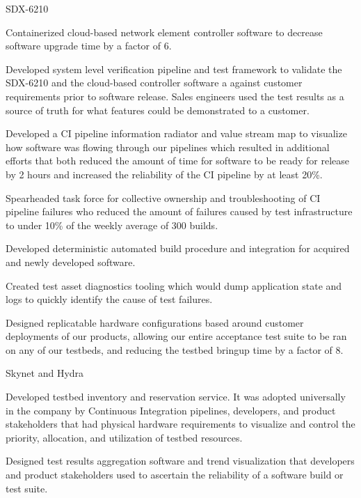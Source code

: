 \begin{cventries}
  \cventry
    {} {SDX-6210} {} {} {
      \begin{cvitems} %
        \item {Containerized cloud-based network element controller software to decrease software upgrade time by a factor of 6.}
        \item {Developed system level verification pipeline and test framework to validate the SDX-6210 and the cloud-based controller software a against customer requirements prior to software release. Sales engineers used the test results as a source of truth for what features could be demonstrated to a customer.}
        \item {Developed a CI pipeline information radiator and value stream map to visualize how software was flowing through our pipelines which resulted in additional efforts that both reduced the amount of time for software to be ready for release by 2 hours and increased the reliability of the CI pipeline by at least 20\%.}
        \item {Spearheaded task force for collective ownership and troubleshooting of CI pipeline failures who reduced the amount of failures caused by test infrastructure to under 10\% of the weekly average of 300 builds.}
        \item {Developed deterministic automated build procedure and integration for acquired and newly developed software.}
        \item {Created test asset diagnostics tooling which would dump application state and logs to quickly identify the cause of test failures.}
        \item {Designed replicatable hardware configurations based around customer deployments of our products, allowing our entire acceptance test suite to be ran on any of our testbeds, and reducing the testbed bringup time by a factor of 8.}
      \end{cvitems}
    }

  \cventry
    {} {Skynet and Hydra} {} {} {
      \begin{cvitems} %
        \item {Developed testbed inventory and reservation service. It was adopted universally in the company by Continuous Integration pipelines, developers, and product stakeholders that had physical hardware requirements to visualize and control the priority, allocation, and utilization of testbed resources.}
        \item {Designed test results aggregation software and trend visualization that developers and product stakeholders used to ascertain the reliability of a software build or test suite.}
      \end{cvitems}
    }

\end{cventries}
